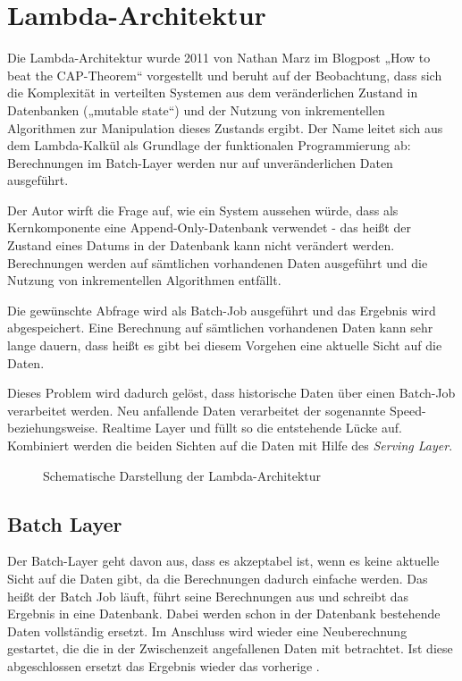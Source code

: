 \documentclass[a4paper,11pt]{scrartcl}
\begin{document}
  \section{Lambda-Architektur}
  Die Lambda-Architektur wurde 2011 von Nathan Marz im Blogpost „How to beat
  the CAP-Theorem“\cite{marz2011} vorgestellt und beruht auf der Beobachtung,
  dass sich die Komplexität in verteilten Systemen aus dem veränderlichen
  Zustand in Datenbanken („mutable state“) und der Nutzung von inkrementellen
  Algorithmen zur Manipulation dieses Zustands ergibt.  Der Name leitet sich
  aus dem Lambda-Kalkül als Grundlage der funktionalen Programmierung ab:
  Berechnungen im Batch-Layer werden nur auf unveränderlichen Daten ausgeführt.

  Der Autor wirft die Frage auf, wie ein System aussehen würde, dass als
  Kernkomponente eine Append-Only-Datenbank verwendet - das heißt der Zustand
  eines Datums in der Datenbank kann nicht verändert werden. Berechnungen werden
  auf sämtlichen vorhandenen Daten ausgeführt und die Nutzung von inkrementellen
  Algorithmen entfällt.

  Die gewünschte Abfrage wird als Batch-Job ausgeführt und das Ergebnis wird
  abgespeichert. Eine Berechnung auf sämtlichen vorhandenen Daten kann sehr
  lange dauern, dass heißt es gibt bei diesem Vorgehen eine aktuelle Sicht auf
  die Daten.

  Dieses Problem wird dadurch gelöst, dass historische Daten über einen Batch-Job
  verarbeitet werden. Neu anfallende Daten verarbeitet der sogenannte Speed- beziehungsweise.
  Realtime Layer und füllt so die entstehende Lücke auf. Kombiniert werden
  die beiden Sichten auf die Daten mit Hilfe des \textit{Serving Layer}.

  \begin{figure}[h]
    \center
    \scalebox{.7}{}
    \caption{Schematische Darstellung der Lambda-Architektur}
    \label{fig:lambdaarch}
  \end{figure}

  \subsection{Batch Layer}
  Der Batch-Layer geht davon aus, dass es akzeptabel ist, wenn es keine
  aktuelle Sicht auf die Daten gibt, da die Berechnungen dadurch einfache
  werden.  Das heißt der Batch Job läuft, führt seine Berechnungen aus und
  schreibt das Ergebnis in eine Datenbank. Dabei werden schon in der Datenbank
  bestehende Daten vollständig ersetzt. Im Anschluss wird wieder eine
  Neuberechnung gestartet, die die in der Zwischenzeit angefallenen Daten
  mit betrachtet. Ist diese abgeschlossen ersetzt das Ergebnis wieder das
  vorherige  .
\end{document}
